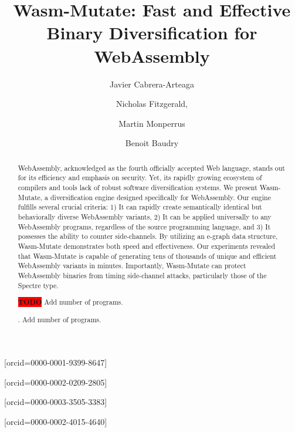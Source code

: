 \documentclass[a4paper,fleqn]{cas-dc}
\newcommand*\badge[1]{ \colorbox{red}{\color{white}#1}}
\newcommand{\tool}{{\sc Wasm-Mutate}\xspace}
\newcommand{\Wasm}{WebAssembly\xspace}
\newcommand{\wasm}{\Wasm}
\newenvironment{revision1}{\color{blue}}{}
\newcommand{\todo}[1]{%
\refstepcounter{todo}
\noindent\textbf{\badge{TODO}} {\color{red}#1}
\addcontentsline{td}{todo}
{\color{red}\thesection.\thetodo\xspace #1}}
\begin{document}
\sloppy



\newcommand\mytitle{\tool: Fast and Effective Binary Diversification for WebAssembly}
\shorttitle{}

\title [mode = title]{\mytitle}

\author[kth-address]{Javier Cabrera-Arteaga}[orcid=0000-0001-9399-8647]\cormark[1]
\author[fastly-address]{Nicholas Fitzgerald,}[orcid=0000-0002-0209-2805]
\author[kth-address]{Martin Monperrus}[orcid=0000-0003-3505-3383]
\author[kth-address]{Benoit Baudry}[orcid=0000-0002-4015-4640]

\address[kth-address]{KTH Royal Institute of Technology, Stockholm, Sweden}
\address[fastly-address]{Fastly Inc., San Francisco, USA }




\begin{abstract}
\begin{revision1}
    
    WebAssembly, acknowledged as the fourth officially accepted Web language, stands out for its efficiency and emphasis on security. 
    Yet, its rapidly growing ecosystem of compilers and tools lack of robust software diversification systems. 
    We present \tool, a diversification engine designed specifically for WebAssembly. 
    Our engine fulfills several crucial criteria: 
    1) It can rapidly create semantically identical but behaviorally diverse WebAssembly variants, 
    2) It can be applied universally to any WebAssembly programs, regardless of the source programming language, and 
    3) It possesses the ability to counter side-channels. 
    By utilizing an e-graph data structure, \tool demonstrates both speed and effectiveness.
    Our experiments revealed that \tool is capable of generating tens of thousands of unique and efficient WebAssembly variants in minutes.
    Importantly, \tool can protect \wasm binaries from timing side-channel attacks, particularly those of the Spectre type.

    \todo{Add number of programs.}
    
\end{revision1} 
\end{abstract}
\end{document}
